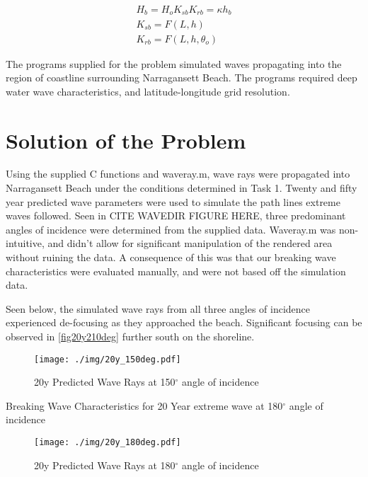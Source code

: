 \begin{align}
H_{b} = H_{o}K_{sb}K_{rb} = \kappa h_{b}
\\ K_{sb} = F(L,h)
\\K_{rb} = F(L,h,\theta_{o})
\label{eq:breaker_char}
\end{align}

The programs supplied for the problem simulated waves propagating into the region of coastline surrounding Narragansett Beach. The programs required deep water wave characteristics, and latitude-longitude grid resolution. 

\section{Solution of the Problem}

Using the supplied C functions and waveray.m, wave rays were propagated into Narragansett Beach under the conditions determined in Task 1. Twenty and fifty year predicted wave parameters were used to simulate the path lines extreme waves followed. Seen in CITE WAVEDIR FIGURE HERE, three predominant angles of incidence were determined from the supplied data. Waveray.m  was non-intuitive, and didn't allow for significant manipulation of the rendered area without ruining the data. A consequence of this was that our breaking wave characteristics were evaluated manually, and were not based off the simulation data.

Seen below, the simulated wave rays from all three angles of incidence experienced de-focusing as they approached the beach. Significant focusing can be observed in \ref{fig20y210deg} further south on the shoreline. 

\begin{figure}[H]
\centering
\texttt{[image: ./img/20y\_150deg.pdf]}
\caption{20y Predicted Wave Rays at 150$^{\circ}$ angle of incidence}
\label{fig:20y150deg}
\end{figure}

\begin{table}[H]
\centering

\caption{Breaking Wave Characteristics for 20 Year extreme wave at 180$^{\circ}$ angle of incidence}
\label{tab:20y_150deg}
\end{table}

\begin{figure}[H]
\centering
\texttt{[image: ./img/20y\_180deg.pdf]}
\caption{20y Predicted Wave Rays at 180$^{\circ}$ angle of incidence}
\label{fig:20y180deg}
\end{figure}

